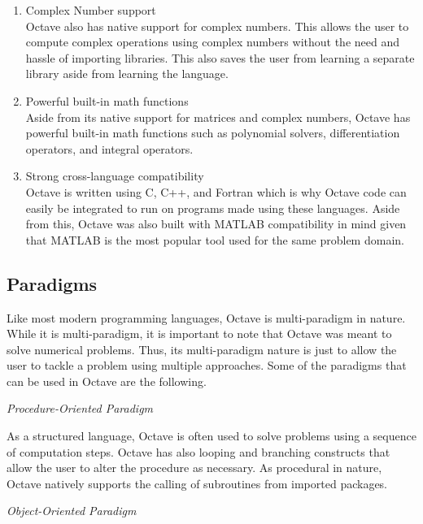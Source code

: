 \documentclass{article}
\begin{document}
\begin{enumerate}
    \item Complex Number support\\
    Octave also has native support for complex numbers. This allows the user to compute complex operations using complex numbers without the need and hassle of importing libraries. This also saves the user from learning a separate library aside from learning the language.

    \item Powerful built-in math functions\\
    Aside from its native support for matrices and complex numbers, Octave has powerful built-in math functions such as polynomial solvers, differentiation operators, and integral operators.

    \item Strong cross-language compatibility\\
    Octave is written using C, C++, and Fortran which is why Octave code can easily be integrated to run on programs made using these languages. Aside from this, Octave was also built with MATLAB compatibility in mind given that MATLAB is the most popular tool used for the same problem domain.

\end{enumerate}



\subsection*{Paradigms}
\par
Like most modern programming languages, Octave is multi-paradigm in nature. While it is multi-paradigm, it is important to note that Octave was meant to solve numerical problems. Thus, its multi-paradigm nature is just to allow the user to tackle a problem using multiple approaches. Some of the paradigms that can be used in Octave are the following.

\par
\noindent
\textit{Procedure-Oriented Paradigm}

\par
As a structured language, Octave is often used to solve problems using a sequence of computation steps. Octave has also looping and branching constructs that allow the user to alter the procedure as necessary. As procedural in nature, Octave natively supports the calling of subroutines from imported packages.

\par
\noindent
\textit{Object-Oriented Paradigm}
\end{document}
